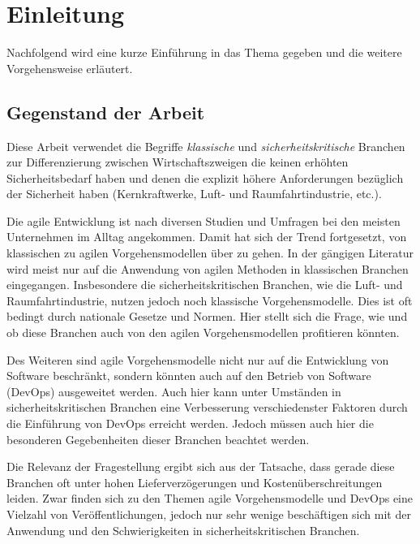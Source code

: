 \chapter{Einleitung} %

Nachfolgend wird eine kurze Einführung in das Thema gegeben und die weitere Vorgehensweise erläutert.

\section{Gegenstand der Arbeit}

Diese Arbeit verwendet die Begriffe \emph{klassische} und \emph{sicherheitskritische} Branchen zur Differenzierung zwischen Wirtschaftszweigen die keinen erhöhten Sicherheitsbedarf haben und denen die explizit höhere Anforderungen bezüglich der Sicherheit haben (Kernkraftwerke, Luft- und Raumfahrtindustrie, etc.).

Die agile Entwicklung ist nach diversen Studien und Umfragen \parencite[vgl.][]{VersionOne:2015aa, HP:2015aa} bei den meisten Unternehmen im Alltag angekommen.
Damit hat sich der Trend fortgesetzt, von klassischen zu agilen Vorgehensmodellen über zu gehen. \parencite[Vgl.][]{Rodriguez:2012:SAL:2372251.2372275}
In der gängigen Literatur wird meist nur auf die Anwendung von agilen Methoden in klassischen Branchen eingegangen.
Insbesondere die sicherheitskritischen Branchen, wie die Luft- und Raumfahrtindustrie, nutzen jedoch noch klassische Vorgehensmodelle.
Dies ist oft bedingt durch nationale Gesetze und Normen.
Hier stellt sich die Frage, wie und ob diese Branchen auch von den agilen Vorgehensmodellen profitieren könnten.

Des Weiteren sind agile Vorgehensmodelle nicht nur auf die Entwicklung von Software beschränkt, sondern könnten auch auf den Betrieb von Software (DevOps) ausgeweitet werden.
Auch hier kann unter Umständen in sicherheitskritischen Branchen eine Verbesserung verschiedenster Faktoren durch die Einführung von DevOps erreicht werden.
Jedoch müssen auch hier die besonderen Gegebenheiten dieser Branchen beachtet werden.

Die Relevanz der Fragestellung ergibt sich aus der Tatsache, dass gerade diese Branchen oft unter hohen Lieferverzögerungen und Kostenüberschreitungen leiden.
Zwar finden sich zu den Themen agile Vorgehensmodelle und DevOps eine Vielzahl von Veröffentlichungen, jedoch nur sehr wenige beschäftigen sich mit der Anwendung und den Schwierigkeiten in sicherheitskritischen Branchen.

